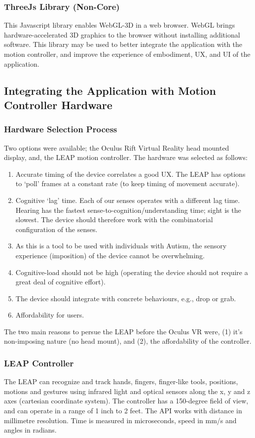 \documentclass[a4paper, 11pt]{article}
\begin{document}
\subsubsection{ThreeJs Library (Non-Core)}
This Javascript library enables WebGL-3D in a web browser. WebGL brings hardware-accelerated 3D graphics to the browser without installing additional software. This library may be used to better integrate the application with the motion controller, and improve the experience of embodiment, UX, and UI of the application.


\subsection{Integrating the Application with Motion Controller Hardware }\label{hardware}
\subsubsection{Hardware Selection Process}
Two options were available; the Oculus Rift Virtual Reality head mounted display, and, the LEAP motion controller. The hardware was selected as follows: 
\begin{enumerate}
\item Accurate timing of the device correlates a good UX. The LEAP has options to ‘poll’ frames at a constant rate (to keep timing of movement accurate).
\item Cognitive ‘lag’ time. Each of our senses operates with a different lag time. Hearing has the fastest sense-to-cognition/understanding time; sight is the slowest. The device should therefore work with the combinatorial configuration of the senses.
\item As this is a tool to be used with individuals with Autism, the sensory experience (imposition) of the device cannot be overwhelming.
\item Cognitive-load should not be high (operating the device should not require a great deal of cognitive effort).
\item The device should integrate with concrete behaviours, e.g., drop or grab. 
\item Affordability for users.
\end{enumerate}
The two main reasons to persue the LEAP before the Oculus VR were, (1) it's non-imposing nature (no head mount), and (2), the affordability of the controller.

\subsubsection{LEAP Controller}
The LEAP can recognize and track hands, fingers, finger-like tools, positions, motions and gestures using infrared light and optical sensors along the x, y and z axes (cartesian coordinate system). The controller has a 150-degree field of view, and can operate in a range of 1 inch to 2 feet. The API works with distance in millimetre resolution. Time is measured in microseconds, speed in mm/s and angles in radians.
\end{document}
